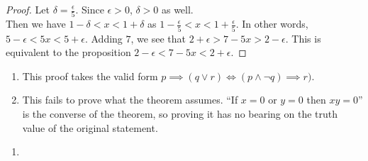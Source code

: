 \documentclass[12pt]{scrartcl} %
\begin{document}
	\begin{proof}
		Let $\delta = \frac{\epsilon}{5}$. Since $\epsilon > 0$, $\delta > 0$ as well. \\Then we have $1 - \delta < x < 1 + \delta$ as $1 - \frac{\epsilon}{5} < x < 1 + \frac{\epsilon}{5}$. In other words, $5 - \epsilon < 5x < 5 + \epsilon$. Adding $7$, we see that $2 + \epsilon > 7 - 5x > 2 - \epsilon$. This is equivalent to the proposition $2 - \epsilon < 7 - 5x < 2 + \epsilon$.
	\end{proof}

\begin{enumerate}
	\item This proof takes the valid form $p \implies (q \lor r) \iff (p \land \neg q) \implies r)$.
	\item This fails to prove what the theorem assumes. ``If $x = 0$ or $y = 0$ then $xy = 0$'' is the converse of the theorem, so proving it has no bearing on the truth value of the original statement.
\end{enumerate}

\begin{enumerate}
	\item 
\end{enumerate}
\end{document}
